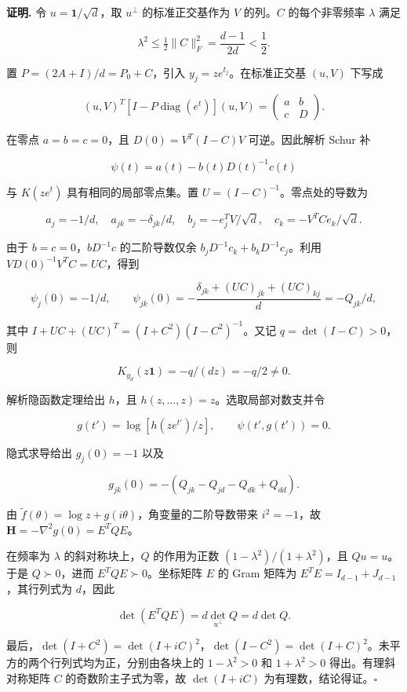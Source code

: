 \documentclass[11pt,a4paper]{article}
\begin{document}
\textbf{证明.} 令 \(u=\mathbf1/\sqrt d\)，取 \(u^\perp\) 的标准正交基作为 \(V\) 的列。\(C\) 的每个非零频率 \(\lambda\) 满足

\[
\lambda^2\le\tfrac12\|C\|_F^2=\frac{d-1}{2d}<\frac12.
\]

置 \(P=(2A+I)/d=P_0+C\)，引入 \(y_j=ze^{t_j}\)。在标准正交基 \((u,V)\) 下写成

\[
(u,V)^T[I-P\operatorname{diag}(e^t)](u,V)
=\begin{pmatrix}a&b\\c&D\end{pmatrix}.
\]

在零点 \(a=b=c=0\)，且 \(D(0)=V^T(I-C)V\) 可逆。因此解析 Schur 补

\[
\psi(t)=a(t)-b(t)D(t)^{-1}c(t)
\]

与 \(K(ze^t)\) 具有相同的局部零点集。置 \(U=(I-C)^{-1}\)。零点处的导数为

\[
a_j=-1/d,\quad a_{jk}=-\delta_{jk}/d,\quad
b_j=-e_j^TV/\sqrt d,\quad c_k=-V^TCe_k/\sqrt d.
\]

由于 \(b=c=0\)，\(bD^{-1}c\) 的二阶导数仅余 \(b_jD^{-1}c_k+b_kD^{-1}c_j\)。利用 \(VD(0)^{-1}V^TC=UC\)，得到

\[
\psi_j(0)=-1/d,\qquad
\psi_{jk}(0)=-\frac{\delta_{jk}+(UC)_{jk}+(UC)_{kj}}d=-Q_{jk}/d,
\]

其中 \(I+UC+(UC)^T=(I+C^2)(I-C^2)^{-1}\)。又记 \(q=\det(I-C)>0\)，则

\[
K_{y_d}(z\mathbf1)=-q/(dz)=-q/2\ne0.
\]

解析隐函数定理给出 \(h\)，且 \(h(z,\ldots,z)=z\)。选取局部对数支并令

\[
g(t')=\log[h(ze^{t'})/z],\qquad \psi(t',g(t'))=0.
\]

隐式求导给出 \(g_j(0)=-1\) 以及

\[
g_{jk}(0)=-(Q_{jk}-Q_{jd}-Q_{dk}+Q_{dd}).
\]

由 \(\widetilde f(\theta)=\log z+g(i\theta)\)，角变量的二阶导数带来 \(i^2=-1\)，故 \(\mathbf H=-\nabla^2g(0)=E^TQE\)。

在频率为 \(\lambda\) 的斜对称块上，\(Q\) 的作用为正数 \((1-\lambda^2)/(1+\lambda^2)\)，且 \(Qu=u\)。于是 \(Q\succ0\)，进而 \(E^TQE\succ0\)。坐标矩阵 \(E\) 的 Gram 矩阵为 \(E^TE=I_{d-1}+J_{d-1}\)，其行列式为 \(d\)，因此

\[
\det(E^TQE)=d\det_{u^\perp}Q=d\det Q.
\]

最后，\(\det(I+C^2)=\det(I+iC)^2\)，\(\det(I-C^2)=\det(I+C)^2\)。未平方的两个行列式均为正，分别由各块上的 \(1-\lambda^2>0\) 和 \(1+\lambda^2>0\) 得出。有理斜对称矩阵 \(C\) 的奇数阶主子式为零，故 \(\det(I+iC)\) 为有理数，结论得证。\(\square\)
\end{document}
